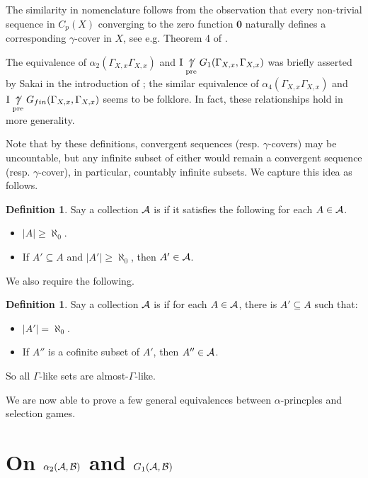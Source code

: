 \documentclass{amsart}
\renewcommand{\vec}{\mathbf}
\theoremstyle{plain}
\theoremstyle{definition}
\newtheorem{definition}[theorem]{Definition}
\theoremstyle{remark}
\theoremstyle{plain}
\theoremstyle{definition}
\theoremstyle{remark}
\begin{document}
The similarity in nomenclature follows from the observation that every non-trivial sequence in
\(C_p(X)\) converging to the zero function \(\vec{0}\) naturally defines a corresponding
\(\gamma\)-cover in \(X\), see e.g. Theorem 4 of
\cite{MR1396994}.

The equivalence of \(\alpha_2(\Gamma_{X,x}\Gamma_{X,x})\) and 
\(\mathrm{I}\underset{\text{pre}}{\not\uparrow} G_1(\Gamma_{X,x},\Gamma_{X,x})\) was briefly asserted by Sakai
in the introduction of \cite{MR2280899}; the similar
equivalence of \(\alpha_4(\Gamma_{X,x}\Gamma_{X,x})\) and 
\(\mathrm{I}\underset{\text{pre}}{\not\uparrow} G_{fin}(\Gamma_{X,x},\Gamma_{X,x})\) seems to be folklore.
In fact, these relationships hold in more generality.

Note that by these definitions, convergent sequences (resp. \(\gamma\)-covers) may be uncountable,
but any infinite subset of either would remain a convergent sequence (resp. \(\gamma\)-cover),
in particular, countably infinite subsets. We capture this idea as follows.

\begin{definition}
Say a collection \(\mathcal{A}\) is  if it satisfies the following
for each \(A\in\mathcal{A}\).
\begin{itemize}
\item \(|A|\geq\aleph_0\).
\item If \(A'\subseteq A\) and \(|A'|\geq\aleph_0\), then \(A'\in\mathcal{A}\).
\end{itemize}
\end{definition}

We also require the following.

\begin{definition}
Say a collection \(\mathcal{A}\) is  if
for each \(A\in\mathcal{A}\), there is \(A'\subseteq A\) such that:
\begin{itemize}
\item \(|A'|=\aleph_0\).
\item If \(A''\) is a cofinite subset of \(A'\), then \(A''\in\mathcal{A}\).
\end{itemize}
\end{definition}

So all \(\Gamma\)-like sets are almost-\(\Gamma\)-like.

We are now able to prove a few general equivalences between \(\alpha\)-princples
and selection games.

\section{On \(\alpha_2(\mathcal{A},\mathcal{B})\) and \(G_1(\mathcal{A},\mathcal{B})\)}
\end{document}
